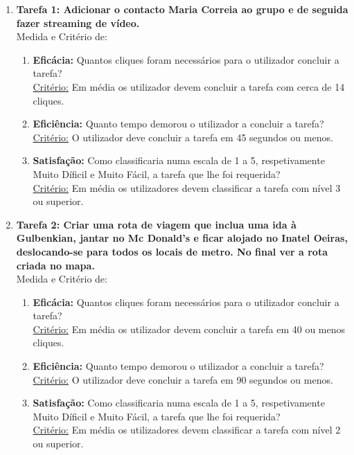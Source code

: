 \documentclass[12pt]{article}
\begin{document}
    \begin{enumerate}
        \item \textbf{Tarefa 1: Adicionar o contacto Maria Correia ao grupo e de seguida fazer streaming de vídeo.}\\
        Medida e Critério de:
        \begin{enumerate}
            \item \textbf{Eficácia:} Quantos cliques foram necessários para o utilizador concluir a tarefa?\\
            \underline{Critério:} Em média os utilizador devem concluir a tarefa com cerca de 14 cliques.
            
            \item \textbf{Eficiência:} Quanto tempo demorou o utilizador a concluir a tarefa?\\
            \underline{Critério:} O utilizador deve concluir a tarefa em 45 segundos ou menos.
            
            \item \textbf{Satisfação:} Como classificaria numa escala de 1 a 5, respetivamente Muito Díficil e Muito Fácil, a tarefa que lhe foi requerida?\\
            \underline{Critério:} Em média os utilizadores devem classificar a tarefa com nível 3 ou superior.
        \end{enumerate}
        
        \item \textbf{Tarefa 2: Criar uma rota de viagem que inclua uma ida à Gulbenkian, jantar no Mc Donald's e ficar alojado no Inatel Oeiras, deslocando-se para todos os locais de metro. No final ver a rota criada no mapa.}\\
        Medida e Critério de:
        \begin{enumerate}
            \item \textbf{Eficácia:} Quantos cliques foram necessários para o utilizador concluir a tarefa?\\
            \underline{Critério:} Em média os utilizador devem concluir a tarefa em 40 ou menos cliques.
            
            \item \textbf{Eficiência:} Quanto tempo demorou o utilizador a concluir a tarefa?\\
            \underline{Critério:} O utilizador deve concluir a tarefa em 90 segundos ou menos.
            
            \item \textbf{Satisfação:} Como classificaria numa escala de 1 a 5, respetivamente Muito Díficil e Muito Fácil, a tarefa que lhe foi requerida?\\
            \underline{Critério:} Em média os utilizadores devem classificar a tarefa com nível 2 ou superior.
        \end{enumerate}
        

\end{enumerate}
\end{document}
